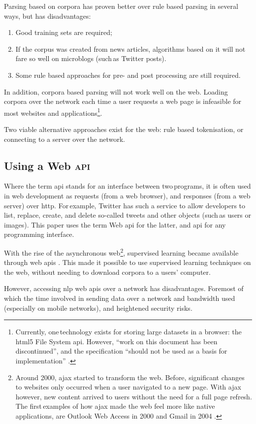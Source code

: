 Parsing based on corpora has proven better over rule based
  parsing in several ways, but has disadvantages:

\begin{enumerate}
\item Good training sets are required;
\item If the corpus was created from news articles, algorithms based on it
  will not fare so well on microblogs (such\,as Twitter posts).
\item Some rule based approaches for pre- and post processing are still
  required.
\end{enumerate}

\noindent In addition, corpora based parsing will not work well on the web.
Loading corpora over the network each time a user requests a web page is
  infeasible for most websites and applications\footnote{Currently,
      one\,technology exists for storing large datasets in a browser: the
      \acrshort{html5} File System \acrshort{api}.
    However, ``work on this document has been discontinued'', and the
      specification ``should not be used as a basis for implementation''
      \autocite{urhane-file-api}.}.

Two viable alternative approaches exist for the web: rule based tokenisation,
  or connecting to a server over the network.

\subsection{Using a Web \textsc{api}}\label{using-a-web}

Where the term \gls{api} stands for an interface between two\,programs,
  it is often used in web development as requests (from a web browser),
  and responses (from a web server) over \gls{http}.
For\,example, Twitter has such a service to allow developers to list,
  replace, create, and delete so-called tweets and other objects (such\,as
  users or images).
This paper uses the term Web \gls{api} for the latter, and \gls{api} for
any programming interface.

With the rise of the asynchronous web\footnote{Around 2000,
    \gls{ajax} started to transform the web.
  Before, significant changes to websites only occurred when a user
    navigated to a new page. 
  With \gls{ajax} however, new content arrived to users without the need
    for a full page refresh.
  The first\,examples of how \gls{ajax} made the web feel more like native
    applications, are Outlook Web Access in 2000
    \autocite{technet-outlook-web-access} and Gmail in 2004
    \autocite{gmailblog-gmail-ajax}.},
  supervised learning became available through web \glspl{api}
  \autocites{textteaser-web-api}{wordnet-web-api}{textrazor-web-api}.
This made it possible to use supervised learning techniques on the web,
  without needing to download corpora to a users' computer.

However, accessing \gls{nlp} web \glspl{api} over a network has
  disadvantages.
Foremost of which the time involved in sending data over a network and
  bandwidth used (especially on mobile networks), and heightened security
  risks.
